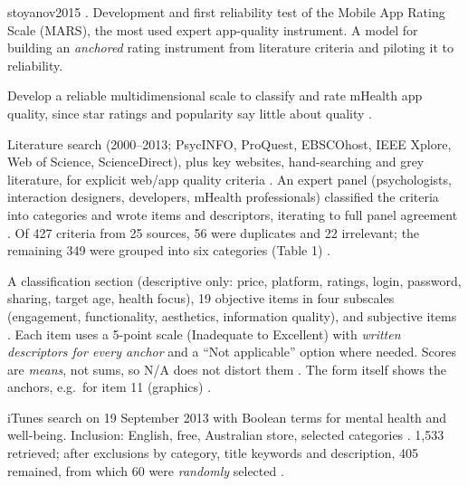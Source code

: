 \begin{papercard}{stoyanov2015}
   . Development and first reliability test of the Mobile App Rating Scale (MARS), the most used expert app-quality instrument. A model for building an \emph{anchored} rating instrument from literature criteria and piloting it to reliability.

 Develop a reliable multidimensional scale to classify and rate mHealth app quality, since star ratings and popularity say little about quality .

 Literature search (2000--2013; PsycINFO, ProQuest, EBSCOhost, IEEE Xplore, Web of Science, ScienceDirect), plus key websites, hand-searching and grey literature, for explicit web/app quality criteria . An expert panel (psychologists, interaction designers, developers, mHealth professionals) classified the criteria into categories and wrote items and descriptors, iterating to full panel agreement . Of 427 criteria from 25 sources, 56 were duplicates and 22 irrelevant; the remaining 349 were grouped into six categories (Table 1) .

 A classification section (descriptive only: price, platform, ratings, login, password, sharing, target age, health focus), 19 objective items in four subscales (engagement, functionality, aesthetics, information quality), and subjective items . Each item uses a 5-point scale (Inadequate to Excellent) with \emph{written descriptors for every anchor} and a ``Not applicable'' option where needed. Scores are \emph{means}, not sums, so N/A does not distort them . The form itself shows the anchors, e.g.\ for item 11 (graphics) .

 iTunes search on 19 September 2013 with Boolean terms for mental health and well-being. Inclusion: English, free, Australian store, selected categories . 1{,}533 retrieved; after exclusions by category, title keywords and description, 405 remained, from which 60 were \emph{randomly} selected .


\end{papercard}
